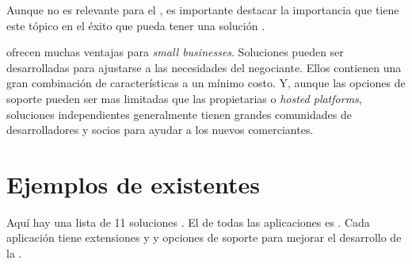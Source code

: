 Aunque no es relevante para el \framework, es importante destacar la importancia que tiene este tópico en el éxito que pueda tener una solución \ecommerce. 



\opensource \ecommerce \shoppingcarts ofrecen muchas ventajas para \textit{small businesses}. Soluciones \opensource pueden ser desarrolladas para ajustarse a las necesidades del negociante. Ellos contienen una gran combinación de características a un mínimo costo. Y, aunque las opciones de soporte pueden ser mas limitadas que las propietarias o \textit{hosted platforms}, soluciones independientes \opensource generalmente tienen grandes comunidades de desarrolladores y socios para ayudar a los nuevos comerciantes.

\section{Ejemplos de \frameworks existentes}

Aquí hay una lista de 11 soluciones \ecommerce \opensource. El \core de todas las aplicaciones es \free. Cada aplicación tiene extensiones \free y \premium y opciones de soporte para mejorar el desarrollo de la \store.

